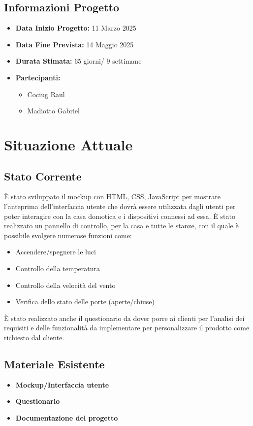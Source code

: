 \documentclass[a4paper,12pt]{article}
\begin{document}
\subsection{Informazioni Progetto}
\begin{itemize}
    \item \textbf{Data Inizio Progetto:} 11 Marzo 2025
    \item \textbf{Data Fine Prevista:} 14 Maggio 2025
    \item \textbf{Durata Stimata:} 65 giorni/ 9 settimane
    \item \textbf{Partecipanti:}
    \begin{itemize}
        \item Cociug Raul
        \item Madiotto Gabriel
    \end{itemize}
\end{itemize}

\section{Situazione Attuale}
\subsection{Stato Corrente}
È stato sviluppato il mockup con HTML, CSS, JavaScript per mostrare l'anteprima dell'interfaccia utente che dovrà essere utilizzata dagli utenti per poter interagire con la casa domotica e i dispositivi connessi ad essa.
È stato realizzato un pannello di controllo, per la casa e tutte le stanze, con il quale è possibile svolgere numerose funzioni come:\begin{itemize}
\item Accendere/spegnere le luci
\item Controllo della temperatura
\item Controllo della velocità del vento
\item Verifica dello stato delle porte (aperte/chiuse)
\end{itemize}
È stato realizzato anche il questionario da dover porre ai clienti per l'analisi dei requisiti e delle funzionalità da implementare per personalizzare il prodotto come richiesto dal cliente.

\subsection{Materiale Esistente}
\begin{itemize}
\item \textbf{Mockup/Interfaccia utente}
\item \textbf{Questionario}
\item \textbf{Documentazione del progetto}
\end{itemize}
\end{document}
